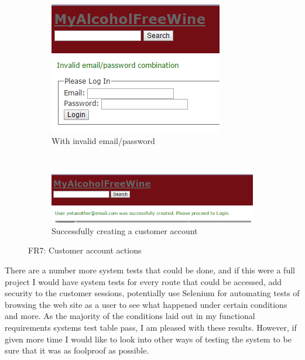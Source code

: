 \documentclass[12pt]{article}
\begin{document}
\begin{figure}[H]
    \centering
    \begin{subfigure}[b]{0.4\textwidth}
        \includegraphics[width=\textwidth]{assets/FR7_screen_3}
        \caption{With invalid email/password}
        \label{fig:FR7 Bad data}
    \end{subfigure}
    ~ %
    \begin{subfigure}[b]{0.4\textwidth}
        \includegraphics[width=\textwidth]{assets/FR7_screen_6}
        \caption{Successfully creating a customer account}
        \label{fig:FR7 Duplicate email}
    \end{subfigure}
    \caption{FR7: Customer account actions}\label{fig:FR7 Customer Account 2}
\end{figure}

There are a number more system tests that could be done, and if this were a full project I would have system tests for every route that could be accessed, add security to the customer sessions, potentially use Selenium for automating tests of browsing the web site as a user to see what happened under certain conditions and more. As the majority of the conditions laid out in my functional requirements systems test table pass, I am pleased with these results. However, if given more time I would like to look into other ways of testing the system to be sure that it was as foolproof as possible.
\end{document}
